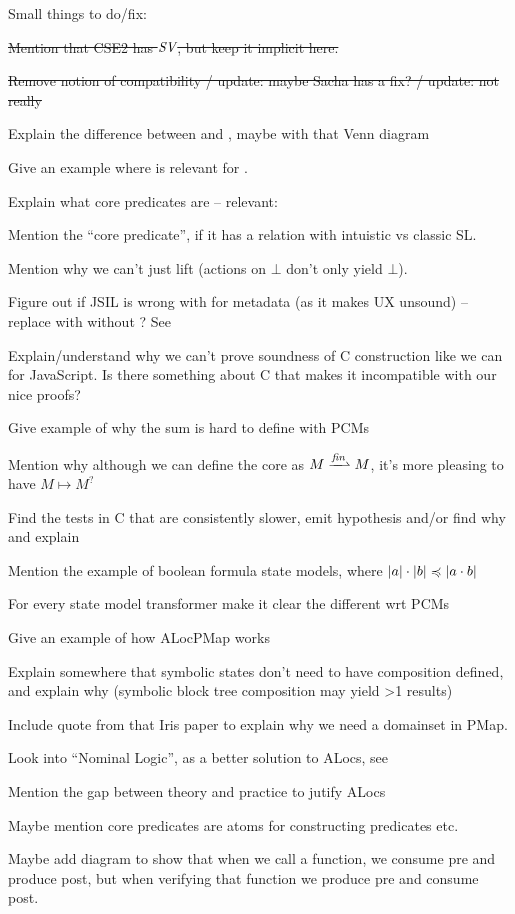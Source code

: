 Small things to do/fix: \begin{compactitem}
 \item \sout{Mention that CSE2 has $\textit{SV}$, but keep it implicit here.}
 \item \sout{Remove notion of compatibility / update: maybe Sacha has a fix? / update: not really}
 \item Explain the difference between \LFail{} and \Err{}, maybe with that Venn diagram
 \item Give an example where \Miss{} is relevant for \consume.
 \item Explain what core predicates are -- relevant: \cite{abstractseplogic}
 \item Mention the  ``core predicate'', if it has a relation with intuistic vs classic SL.
 \item Mention why we can't just lift \execac{} (actions on $\bot$ don't only yield $\bot$).
 \item Figure out if JSIL is wrong with \Ag{} for metadata (as it makes  UX unsound) -- replace with \Frac{} without \store{}? See \cite{towardsjs}
 \item Explain/understand why we can't prove soundness of C construction like we can for JavaScript. Is there something about C that makes it incompatible with our nice proofs?
 \item Give example of why the sum is hard to define with PCMs
 \item Mention why although we can define the core as $M\finmap M$, it's more pleasing to have $M\mapsto M^?$
 \item Find the tests in C that are consistently slower, emit hypothesis and/or find why and explain
 \item Mention the example of boolean formula state models, where $|a| \cdot |b| \preccurlyeq |a\cdot b|$
 \item For every state model transformer make it clear the different wrt PCMs
 \item Give an example of how ALocPMap works
 \item Explain somewhere that symbolic states don't need to have composition defined, and explain why (symbolic block tree composition may yield >1 results)
 \item Include quote from that Iris paper to explain why we need a domainset in PMap.
 \item Look into ``Nominal Logic'', as a better solution to ALocs, see \cite{nominallogic}
 \item Mention the gap between theory and practice to jutify ALocs
 \item Maybe mention core predicates are atoms for constructing predicates etc.
 \item Maybe add diagram to show that when we call a function, we consume pre and produce post, but when verifying that function we produce pre and consume post.
 \end{compactitem}
